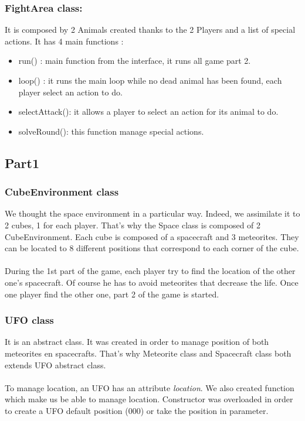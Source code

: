 \subsubsection{FightArea class:}

It is composed by 2 Animals created thanks to the 2 Players and a list of special actions.
It has 4 main functions : 
\begin{itemize}
 \item run() : main function from the interface, it runs all game part 2.
 \item loop() : it runs the main loop while no dead animal has been found, each player select an action to do.
 \item selectAttack(): it allows a player to select an action for its animal to do.
 \item solveRound(): this function manage special actions.
\end{itemize}

\subsection{Part1}

\subsubsection{CubeEnvironment class}

We thought the space environment in a particular way. 
Indeed, we assimilate it to 2 cubes, 1 for each player. That's why the Space class is composed of 2 CubeEnvironment.
Each cube is composed of a spacecraft and 3 meteorites. 
They can be located to 8 different positions that correspond to each corner of the cube.\\
\\
During the 1st part of the game, each player try to find the location of the other one's spacecraft.
Of course he has to avoid meteorites that decrease the life. 
Once one player find the other one, part 2 of the game is started.

\subsubsection{UFO class}

It is an abstract class. 
It was created in order to manage position of both meteorites en spacecrafts.
That's why Meteorite class and Spacecraft class both extends UFO abstract class.\\
\\
To manage location, an UFO has an attribute \textit{location}.
We also created function which make us be able to manage location.
Constructor was overloaded in order to create a UFO default position (000) or take the position in parameter.

